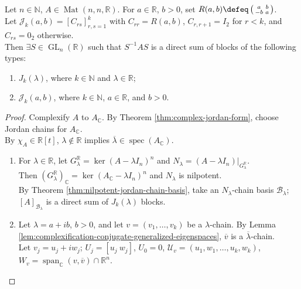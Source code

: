 \begin{theorem} \label{thm:real-jordan-block-form} \\
Let $n\in\mathbb{N}$, $A\in\operatorname{Mat}(n,n,\mathbb{R})$. For $a\in\mathbb{R}$, $b>0$, set $R(a,b)\defeq\left(\begin{smallmatrix}a&b\\-b&a\end{smallmatrix}\right)$.\\
Let $\mathcal{J}_k(a,b)=[C_{rs}]_{r,s=1}^k$ with $C_{rr}=R(a,b)$, $C_{r,r+1}=I_2$ for $r<k$, and $C_{rs}=0_2$ otherwise.\\
Then $\exists S\in\operatorname{GL}_n(\mathbb{R})$ such that $S^{-1}AS$ is a direct sum of blocks of the following types:
\begin{enumerate}[label=(\roman*)]
\setlength{\itemsep}{0pt}
\item $J_k(\lambda)$, where $k\in\mathbb{N}$ and $\lambda\in\mathbb{R}$;
\item $\mathcal{J}_k(a,b)$, where $k\in\mathbb{N}$, $a\in\mathbb{R}$, and $b>0$.
\end{enumerate}
\begin{proof} Complexify $A$ to $A_{\mathbb{C}}$. By Theorem \ref{thm:complex-jordan-form}, choose Jordan chains for $A_{\mathbb{C}}$.\\
By $\chi_A\in\mathbb{R}[t]$, $\lambda\notin\mathbb{R}$ implies $\overline\lambda\in\operatorname{spec}(A_{\mathbb{C}})$.
\begin{enumerate}[label=(\roman*)]
\setlength{\itemsep}{0pt}
\item For $\lambda\in\mathbb{R}$, let $G_{\lambda}^{\mathbb{R}}=\ker(A-\lambda I_n)^n$ and $N_{\lambda}=(A-\lambda I_n)|_{G_{\lambda}^{\mathbb{R}}}$. \\
Then $(G_{\lambda}^{\mathbb{R}})_{\mathbb{C}}=\ker(A_{\mathbb{C}}-\lambda I_n)^n$ and $N_{\lambda}$ is nilpotent.\\
By Theorem \ref{thm:nilpotent-jordan-chain-basis}, take an $N_{\lambda}$-chain basis $\mathcal{B}_{\lambda}$; $[A]_{\mathcal{B}_{\lambda}}$ is a direct sum of $J_k(\lambda)$ blocks.
\item Let $\lambda=a+ib$, $b>0$, and let $v=(v_1,\ldots,v_k)$ be a $\lambda$-chain. By Lemma \ref{lem:complexification-conjugate-generalized-eigenspaces}, $\overline v$ is a $\overline\lambda$-chain.\\
Let $v_j=u_j+iw_j$; $U_j=[u_j\ w_j]$, $U_0=0$, $\mathcal{U}_v=(u_1,w_1,\ldots,u_k,w_k)$,  $W_v=\operatorname{span}_{\mathbb{C}}(v,\overline v)\cap\mathbb{R}^n$.\\

\end{enumerate}
\end{proof}
\end{theorem}
